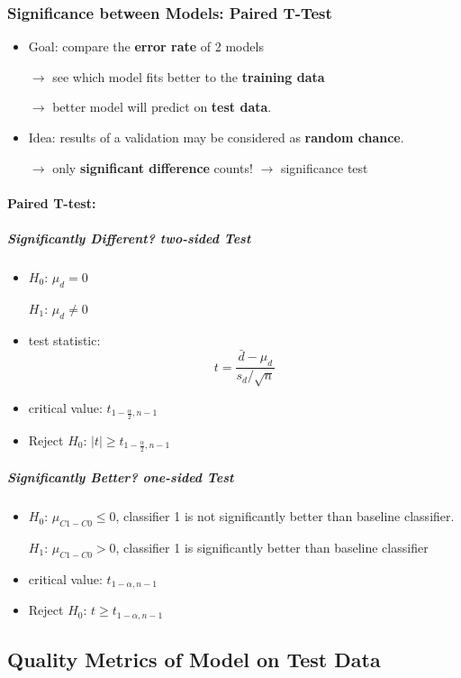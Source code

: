 \subsubsection{Significance between Models: Paired T-Test}
\begin{itemize}
	
	
	\item Goal: compare the \textbf{error rate} of 2 models 
	
	$\rightarrow$ see which model fits better to the \textbf{training data}
	
	$\rightarrow$ better model will predict on \textbf{test data}.
	
	\item Idea: results of a validation may be considered as \textbf{random chance}.
	
	$\rightarrow$ only \textbf{significant difference} counts! $\rightarrow$ significance test
	
\end{itemize}
\paragraph{Paired T-test: }
\subparagraph{Significantly Different? two-sided Test}
\begin{itemize}
	\item $H_0$: $\mu_d = 0$
	
	$H_1$: $\mu_d \neq 0$ 
	\item test statistic: 
	$$t = \frac{\bar{d} - \mu_d}{s_d / \sqrt{n}}$$
	\item critical value: $t_{1-\frac{\alpha}{2}, n-1}$
	\item Reject $H_0$: $|t| \geq t_{1-\frac{\alpha}{2}, n-1}$
\end{itemize}
\subparagraph{Significantly Better? one-sided Test}
\begin{itemize}
	\item $H_0$: $\mu_{C1 - C0} \leq 0$, classifier 1 is not significantly better than baseline classifier.
	
	$H_1$: $\mu_{C1 - C0} > 0$, classifier 1 is significantly better than baseline classifier
	\item critical value: $t_{1-\alpha, n-1}$
	\item Reject $H_0$: $t \geq t_{1-\alpha, n-1}$
\end{itemize}
\subsection{Quality Metrics of Model on Test Data}


